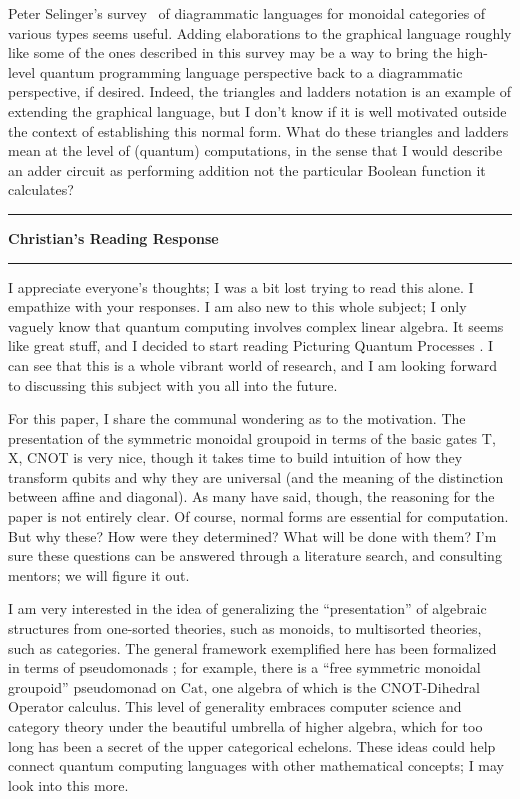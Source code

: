 \documentclass{amsart}
\newcommand{\iam}[1]{
  \vspace{0.25em}
  \hrule
  \vspace{0.25em}
  \textbf{{#1}'s Reading Response}
  \vspace{0.25em}
  \hrule
  \vspace{1em}
}
\begin{document}
Peter Selinger's survey~\cite{SelingerSurvey} of diagrammatic languages for monoidal categories of various types
seems useful. Adding elaborations to the graphical language roughly like some of the ones described in this survey
may be a way to bring the high-level quantum programming language perspective back to a diagrammatic perspective, if
desired. Indeed, the triangles and ladders notation is an example of extending the graphical language, but I don't
know if it is well motivated outside the context of establishing this normal form. What do these triangles and ladders
mean at the level of (quantum) computations, in the sense that I would describe an adder circuit as performing addition
not the particular Boolean function it calculates?

\iam{Christian}

I appreciate everyone's thoughts; I was a bit lost trying to read this alone. I empathize with your responses. I am also new to this whole subject; I only vaguely know that quantum computing involves complex linear algebra. It seems like great stuff, and I decided to start reading Picturing Quantum Processes \cite{PQP}. I can see that this is a whole vibrant world of research, and I am looking forward to discussing this subject with you all into the future.

For this paper, I share the communal wondering as to the motivation. The presentation of the symmetric monoidal groupoid in terms of the basic gates T, X, CNOT is very nice, though it takes time to build intuition of how they transform qubits and why they are universal (and the meaning of the distinction between affine and diagonal). As many have said, though, the reasoning for the paper is not entirely clear. Of course, normal forms are essential for computation. But why these? How were they determined? What will be done with them? I'm sure these questions can be answered through a literature search, and consulting mentors; we will figure it out.

I am very interested in the idea of generalizing the ``presentation'' of algebraic structures from one-sorted theories, such as monoids, to multisorted theories, such as categories. The general framework exemplified here has been formalized in terms of pseudomonads \cite{Pseudomonad}; for example, there is a ``free symmetric monoidal groupoid'' pseudomonad on $\mathrm{Cat}$, one algebra of which is the CNOT-Dihedral Operator calculus. This level of generality embraces computer science and category theory under the beautiful umbrella of higher algebra, which for too long has been a secret of the upper categorical echelons. These ideas could help connect quantum computing languages with other mathematical concepts; I may look into this more.
\end{document}
